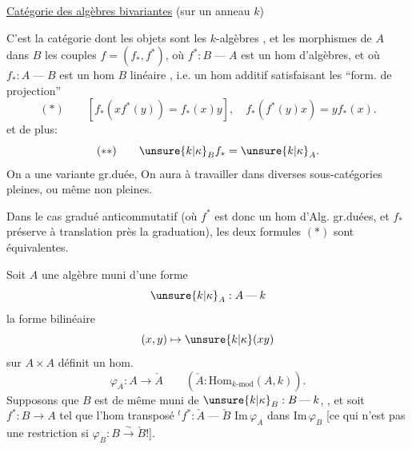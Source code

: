 \uline{Catégorie des algèbres bivariantes} (sur un anneau $k$)

C'est la catégorie dont les objets sont les $k$-algèbres , et les morphismes de $A$ dans $B$ les couples $f=(f_*,f^*)$, où $f^*:B\mathbin{\text{---}}A$ est un hom d'algèbres, et où $f_*:A\mathbin{\text{---}}B$ est un hom $B$ linéaire , i.e. un hom additif satisfaisant les ``form. de projection''
\[
(*)\qquad[f_*(xf^*(y))=f_*(x)y],\quad f_*(f^*(y)x)=yf_*(x).
\]
et de plus:
\[
(**)\qquad\unsure{k|\kappa}_Bf_*=\unsure{k|\kappa}_A.
\]
On a une variante gr.duée,  On aura à travailler dans diverses sous-catégories pleines, ou même non pleines.

Dans le cas gradué anticommutatif (où $f^*$ est donc un hom d'Alg. gr.duées, et  $f_*$ préserve à translation  près la graduation), les deux formules $(*)$ sont équivalentes.


Soit $A$ une algèbre muni d'une forme
\[
\unsure{k|\kappa}_A:A\mathbin{\text{---}}k
\]
 la forme bilinéaire
\[
(x,y)\mapsto\unsure{k|\kappa}(xy)
\]
sur $A\times A$  définit un hom.  
\[
\varphi_A:A\longrightarrow\check A\qquad(\check A:\mathrm{Hom}_{k\text{-}\mathrm{mod}}(A,k)).
\]
Supposons que $B$ est de même muni de $\unsure{k|\kappa}_B:B\mathbin{\text{---}}k$, , et soit $f^*:B\longrightarrow A$ tel que l'hom transposé ${}^tf^*:\check A\mathbin{\text{---}}\check B$  $\mathrm{Im}\,\varphi_A$ dans $\mathrm{Im}\,\varphi_B$ [ce qui n'est pas une restriction si $\varphi_B:B\overset{\sim}\longrightarrow\check B$!].

